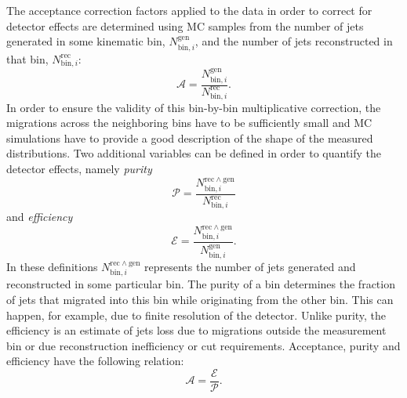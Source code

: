 The acceptance correction factors applied to the data in order to correct for detector effects are determined using MC samples from the number of jets generated in some kinematic bin, $N_{\mathrm{bin},i}^{\mathrm{gen}}$, and the number of jets reconstructed in that bin, $N_{\mathrm{bin},i}^{\mathrm{rec}}$:
\begin{equation}
 \mathcal{A}=\frac{N_{\mathrm{bin},i}^{\mathrm{gen}}}{N_{\mathrm{bin},i}^{\mathrm{rec}}}.
 \label{eq:accdef}
\end{equation}
In order to ensure the validity of this bin-by-bin multiplicative correction, the migrations across the neighboring bins have to be sufficiently small and MC simulations have to provide a good description of the shape of the measured distributions. Two additional variables can be defined in order to quantify the detector effects,  namely \emph{purity}
\begin{equation}
 \mathcal{P}=\frac{N_{\mathrm{bin},i}^{\mathrm{rec \wedge gen}}}{N_{\mathrm{bin},i}^{\mathrm{rec}}}
\label{eq:puritydef}
\end{equation}
and \emph{efficiency}
\begin{equation}
 \mathcal{E}=\frac{N_{\mathrm{bin},i}^{\mathrm{rec \wedge gen}}}{N_{\mathrm{bin},i}^{\mathrm{gen}}}.
\label{eq:efficiencydef}
\end{equation}
In these definitions $N_{\mathrm{bin},i}^{\mathrm{rec \wedge gen}}$ represents the number of jets generated and reconstructed in some particular bin. The purity of a bin determines the fraction of jets that migrated into this bin while originating from the other bin. This can happen, for example, due to finite resolution of the detector. Unlike purity, the efficiency is an estimate of jets loss due to migrations outside the measurement bin or due reconstruction inefficiency or cut requirements. Acceptance, purity and efficiency have the following relation:
\begin{equation}
  \mathcal{A} = \frac{\mathcal{E}}{\mathcal{P}}.
\end{equation}

